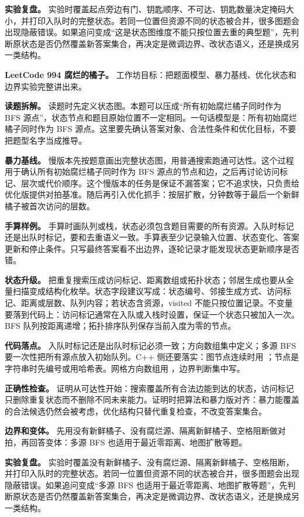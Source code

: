 \textbf{实验复盘。} 实验时覆盖起点旁边有门、钥匙顺序、不可达、钥匙数量决定掩码大小，并打印入队时的完整状态。若同一位置但资源不同的状态被合并，很多图题会出现隐蔽错误。如果追问变成“这是状态图维度不能只按位置去重的典型题”，先判断原状态是否仍然覆盖新答案集合，再决定是微调边界、改状态语义，还是换成另一类结构。

\noindent\textbf{LeetCode 994 腐烂的橘子。} 工作坊目标：把题面模型、暴力基线、优化状态和边界实验完整讲出来。

\textbf{读题拆解。} 读题时先定义状态图。本题可以压成“所有初始腐烂橘子同时作为 BFS 源点”，状态节点和题目原始位置不一定相同。一句话模型是：所有初始腐烂橘子同时作为 BFS 源点。这里要先确认答案对象、合法性条件和优化目标，不要把题型名字当成推导。

\textbf{暴力基线。} 慢版本先按题意画出完整状态图，用普通搜索跑通可达性。这个过程用于确认所有初始腐烂橘子同时作为 BFS 源点的节点和边，之后再讨论访问标记、层次或代价顺序。这个慢版本的任务是保证不漏答案；它不追求快，只负责给优化版提供对拍基准。随后再引入优化抓手：按层扩散，分钟数等于最后一个新鲜橘子被首次访问的层数。

\textbf{手算样例。} 手算时画队列或栈，状态必须包含题目需要的所有资源。入队时标记还是出队时标记，要和去重语义一致。手算表至少记录输入位置、状态变化、答案更新和停止条件。只写最终答案看不出边界，逐轮记录才能发现状态更新顺序是否错。

\textbf{状态升级。} 把重复搜索压成访问标记、距离数组或拓扑状态；邻居生成也要从全量扫描变成结构化枚举。状态字段建议写成：状态编号、邻接生成方式、访问标记、距离或层数、队列内容；若状态含资源，visited 不能只按位置记录。不变量要落到代码上：访问标记通常在入队或入栈时设置，保证一个状态只被加入一次。BFS 队列按距离递增；拓扑排序队列保存当前入度为零的节点。

\textbf{代码落点。} 入队时标记还是出队时标记必须一致；方向数组集中定义；多源 BFS 要一次性把所有源点放入初始队列。C++ 侧还要落实：图节点连续时用 ；节点是字符串时先编号或用哈希表。网格方向数组用 ，边界判断集中写。

\textbf{正确性检查。} 证明从可达性开始：搜索覆盖所有合法边能到达的状态，访问标记只删除重复状态而不删除不同未来能力。证明时把算法和暴力版对齐：暴力能覆盖的合法候选仍然会被考虑，优化结构只替代重复检查，不改变答案集合。

\textbf{边界和变体。} 先用没有新鲜橘子、没有腐烂源、隔离新鲜橘子、空格阻断做对拍，再回答变体：多源 BFS 也适用于最近零距离、地图扩散等题。

\textbf{实验复盘。} 实验时覆盖没有新鲜橘子、没有腐烂源、隔离新鲜橘子、空格阻断，并打印入队时的完整状态。若同一位置但资源不同的状态被合并，很多图题会出现隐蔽错误。如果追问变成“多源 BFS 也适用于最近零距离、地图扩散等题”，先判断原状态是否仍然覆盖新答案集合，再决定是微调边界、改状态语义，还是换成另一类结构。

